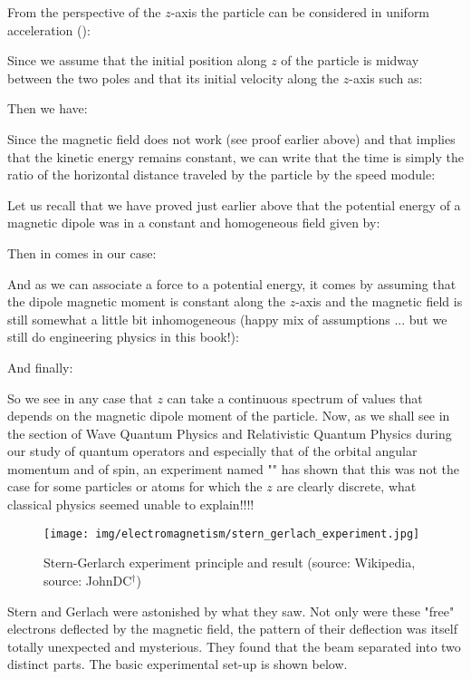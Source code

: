 	From the perspective of the $z$-axis the particle can be considered in uniform acceleration ():
	
	Since we assume that the initial position along $z$ of the particle is midway between the two poles and that its initial velocity along the $z$-axis such as:
	
	Then we have:
	
	Since the magnetic field does not work (see proof earlier above) and that implies that the kinetic energy remains constant, we can write that the time is simply the ratio of the horizontal distance traveled by the particle by the speed module:
	
	Let us recall that we have proved just earlier above that the potential energy of a magnetic dipole was in a constant and homogeneous field given by:
	
	Then in comes in our case:
	
	And as we can associate a force to a potential energy, it comes by assuming that the dipole magnetic moment is constant along the $z$-axis and the magnetic field is still somewhat a little bit inhomogeneous (happy mix of assumptions ... but we still do engineering physics in this book!):
	
	And finally:
	
	So we see in any case that $z$ can take a continuous spectrum of values that depends on the magnetic dipole moment of the particle. Now, as we shall see in the section of Wave Quantum Physics and Relativistic Quantum Physics during our study of quantum operators and especially that of the orbital angular momentum and of spin, an experiment named "" has shown that this was not the case for some particles or atoms for which the $z$ are clearly discrete, what classical physics seemed unable to explain!!!!
	\begin{figure}[H]
		\centering
		\texttt{[image: img/electromagnetism/stern\_gerlach\_experiment.jpg]}
		\caption[Stern-Gerlarch experiment principle and result]{Stern-Gerlarch experiment principle and result (source: Wikipedia, source: JohnDC$^\dagger$)}
	\end{figure}
	Stern and Gerlach were astonished by what they saw. Not only were these "free" electrons deflected by the magnetic field, the pattern of their deflection was itself totally unexpected and mysterious. They found that the beam separated into two distinct parts. The basic experimental set-up is shown below.

